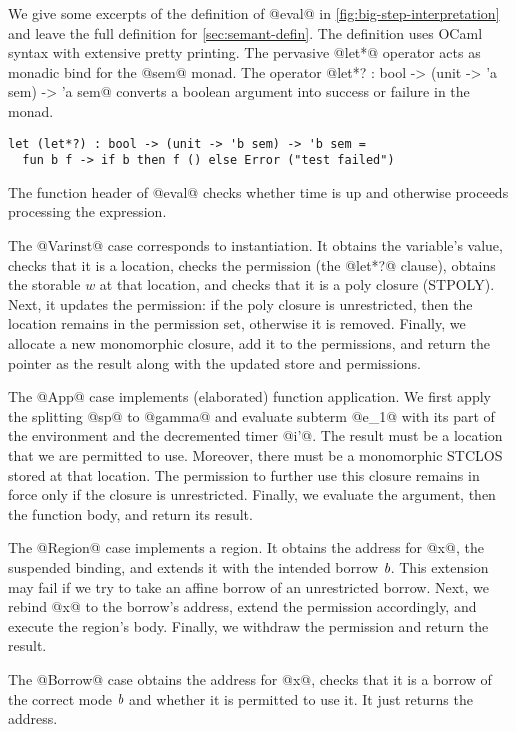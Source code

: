 

We give some excerpts of the definition of @eval@ in
\cref{fig:big-step-interpretation} and leave the full
definition for \cref{sec:semant-defin}.
The definition uses OCaml syntax with extensive pretty
printing. The pervasive @let*@ operator acts as monadic bind
for the @sem@ monad. The operator
@let*? : bool -> (unit -> 'a sem) -> 'a sem@
 converts a boolean
argument into success or failure in the monad.
\begin{lstlisting}
let (let*?) : bool -> (unit -> 'b sem) -> 'b sem =
  fun b f -> if b then f () else Error ("test failed")
\end{lstlisting}
The function header of @eval@ checks
whether time is up and otherwise proceeds processing the expression.

The @Varinst@ case corresponds to instantiation. It
obtains the variable's value, checks that it is a location, checks the
permission (the @let*?@ clause), obtains the storable $w$ at that
location, and checks that it is a poly closure (STPOLY). Next, it updates the
permission: if the poly closure is unrestricted, then the location
remains in the permission set, otherwise it is removed. Finally, we
allocate a new monomorphic closure, add it to the permissions, and
return the pointer as the result along with the updated store and
permissions.

The @App@ case implements (elaborated) function application.
We first apply the splitting @sp@ to @gamma@ and
evaluate subterm @e_1@ with its part of the environment and the
decremented timer @i'@. The result must be a location that we are
permitted to use. Moreover, there must be a monomorphic STCLOS stored
at that location. The permission to further use this closure  remains
in force only if the closure is unrestricted. Finally, we evaluate the
argument, then the function body, and return its result.



The @Region@ case implements a region. It obtains the address for @x@,
the suspended binding, and extends it with the intended borrow
$\textit{b}$. This extension may fail if we try to take an affine borrow
of an unrestricted borrow. Next, we rebind @x@ to the borrow's
address, extend the permission accordingly, and execute the region's
body.  Finally, we withdraw the permission and return the result.

The @Borrow@ case obtains the address for @x@, checks that it is a
borrow of the correct mode $\textit{b}$ and whether it is permitted to
use it. It just returns the address.

\lstDeleteShortInline@

